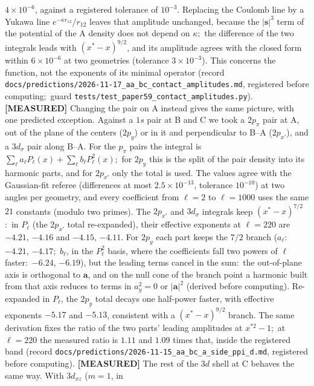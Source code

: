 \documentclass[aps,pra,twocolumn,superscriptaddress,longbibliography]{revtex4-2}
\begin{document}
$4\times10^{-6}$, against a registered tolerance of $10^{-3}$.  Replacing the Coulomb line by a
Yukawa line $e^{-\kappa r_{12}}/r_{12}$ leaves that amplitude unchanged, because the $|\mathbf{s}|^3$
term of the potential of the A density does not depend on $\kappa$;\ the difference of the two
integrals leads with $(x^{*}-x)^{9/2}$, and its amplitude agrees with the closed form within
$6\times10^{-6}$ at two geometries (tolerance $3\times10^{-3}$).  This concerns the function, not
the exponents of its minimal operator (record
\texttt{docs/predictions/2026-11-17\_aa\_bc\_contact\_amplitudes.md}, registered before computing;\ guard
\texttt{tests/test\_paper59\_contact\_amplitudes.py}).
\textbf{[MEASURED]} Changing the pair on A instead gives the same picture, with one predicted
exception.  Against a $1s$ pair at B and C we took a $2p_\pi$ pair at A, out of the plane of the
centers ($2p_y$) or in it and perpendicular to B--A ($2p_{x'}$), and a $3d_\sigma$ pair along B--A.
For the $p_\pi$ pairs the integral is $\sum_\ell a_\ell P_\ell(x)+\sum_\ell b_\ell P_\ell^{2}(x)$;\ for
$2p_y$ this is the split of the pair density into its harmonic parts, and for $2p_{x'}$ only the
total is used.  The values agree with the Gaussian-fit referee (differences at most
$2.5\times10^{-13}$, tolerance $10^{-10}$) at two angles per geometry, and every
coefficient from $\ell=2$ to $\ell=1000$ uses the same $21$ constants (modulo two primes).  The
$2p_{x'}$ and $3d_\sigma$ integrals keep $(x^{*}-x)^{7/2}$:\ in $P_\ell$ (the $2p_{x'}$ total
re-expanded), their effective exponents at $\ell=220$ are $-4.21$, $-4.16$ and $-4.15$, $-4.11$.  For $2p_y$ each part
keeps the $7/2$ branch ($a_\ell$:\ $-4.21$, $-4.17$;\ $b_\ell$, in the $P_\ell^{2}$ basis, where the
coefficients fall two powers of $\ell$ faster:\ $-6.24$, $-6.19$), but the leading terms cancel in the
sum:\ the out-of-plane axis is orthogonal to $\mathbf{a}$, and on the null cone of the branch point
a harmonic built from that axis reduces to terms in $a_y^{2}=0$ or $|\mathbf{a}|^{2}$ (derived before
computing).  Re-expanded in
$P_\ell$, the $2p_y$ total decays one half-power faster, with effective exponents $-5.17$ and
$-5.13$, consistent with a $(x^{*}-x)^{9/2}$ branch.  The same derivation fixes the ratio of
the two parts' leading amplitudes at $x^{*2}-1$;\ at $\ell=220$ the measured ratio is $1.11$ and
$1.09$ times that, inside the registered band (record
\texttt{docs/predictions/2026-11-15\_aa\_bc\_a\_side\_ppi\_d.md}, registered before computing).
\textbf{[MEASURED]} The rest of the $3d$ shell at C behaves the same way.  With $3d_{xz}$ ($m=1$, in
\end{document}
